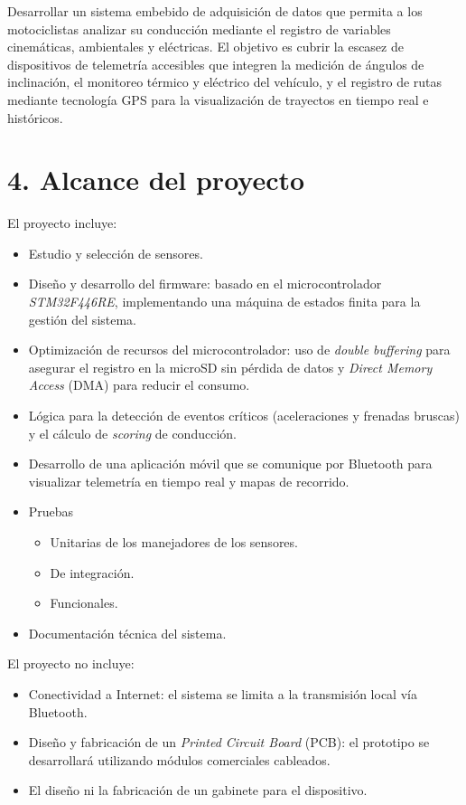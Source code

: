 \documentclass[
11pt, %
]{charter}
\begin{document}
Desarrollar un sistema embebido de adquisición de datos que permita a los motociclistas analizar su conducción mediante el registro de variables cinemáticas, ambientales y eléctricas. El objetivo es cubrir la escasez de dispositivos de telemetría accesibles que integren la medición de ángulos de inclinación, el monitoreo térmico y eléctrico del vehículo, y el registro de rutas mediante tecnología GPS para la visualización de trayectos en tiempo real e históricos.

\section{4. Alcance del proyecto}
\label{sec:alcance}

El proyecto incluye:

\begin{itemize}
	\item Estudio y selección de sensores.
	\item Diseño y desarrollo del firmware: basado en el microcontrolador \textit{STM32F446RE}, implementando una máquina de estados finita para la gestión del sistema.
	\item Optimización de recursos del microcontrolador: uso de \textit{double buffering} para asegurar el registro en la microSD sin pérdida de datos y \textit{Direct Memory Access} (DMA) para reducir el consumo.
	\item Lógica para la detección de eventos críticos (aceleraciones y frenadas bruscas) y el cálculo de \textit{scoring} de conducción.
	\pagebreak
	\item Desarrollo de una aplicación móvil que se comunique por Bluetooth para visualizar telemetría en tiempo real y mapas de recorrido.
	\item Pruebas
		\begin{itemize}
		\item Unitarias de los manejadores de los sensores.
		\item De integración.
		\item Funcionales.
		\end{itemize}
	\item Documentación técnica del sistema.
		
	
\end{itemize}


El proyecto no incluye:
\begin{itemize}
	\item Conectividad a Internet: el sistema se limita a la transmisión local vía Bluetooth.
	\item Diseño y fabricación de un \textit{Printed Circuit Board} (PCB): el prototipo se desarrollará utilizando módulos comerciales cableados.
	\item El diseño ni la fabricación de un gabinete para el dispositivo.
\end{itemize}
\end{document}
